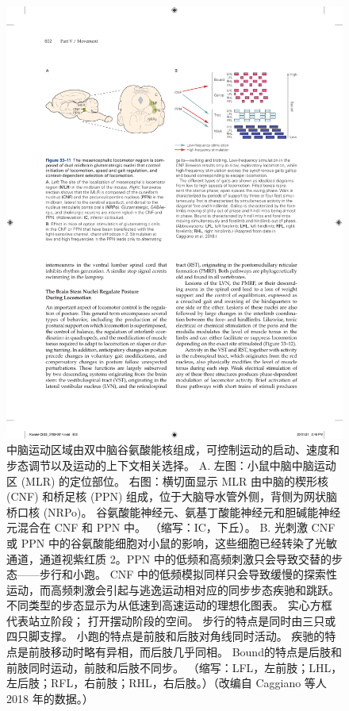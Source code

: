 \begin{figure}[htbp]
	\centering
	\includegraphics[width=0.9\linewidth]{chap33/fig_33_11}
	\caption{中脑运动区域由双中脑谷氨酸能核组成，可控制运动的启动、速度和步态调节以及运动的上下文相关选择。 A. 左图：小鼠中脑中脑运动区 (MLR) 的定位部位。 右图：横切面显示 MLR 由中脑的楔形核 (CNF) 和桥足核 (PPN) 组成，位于大脑导水管外侧，背侧为网状脑桥口核 (NRPo)。 谷氨酸能神经元、氨基丁酸能神经元和胆碱能神经元混合在 CNF 和 PPN 中。 （缩写：IC，下丘）。 B. 光刺激 CNF 或 PPN 中的谷氨酸能细胞对小鼠的影响，这些细胞已经转染了光敏通道，通道视紫红质 2。PPN 中的低频和高频刺激只会导致交替的步态——步行和小跑。 CNF 中的低频模拟同样只会导致缓慢的探索性运动，而高频刺激会引起与逃逸运动相对应的同步步态疾驰和跳跃。 不同类型的步态显示为从低速到高速运动的理想化图表。 实心方框代表站立阶段； 打开摆动阶段的空间。 步行的特点是同时由三只或四只脚支撑。 小跑的特点是前肢和后肢对角线同时活动。 疾驰的特点是前肢移动时略有异相，而后肢几乎同相。 Bound的特点是后肢和前肢同时运动，前肢和后肢不同步。 （缩写：LFL，左前肢；LHL，左后肢；RFL，右前肢；RHL，右后肢。）（改编自 Caggiano 等人 2018 年的数据。）}
	\label{fig:33_11}
\end{figure}

